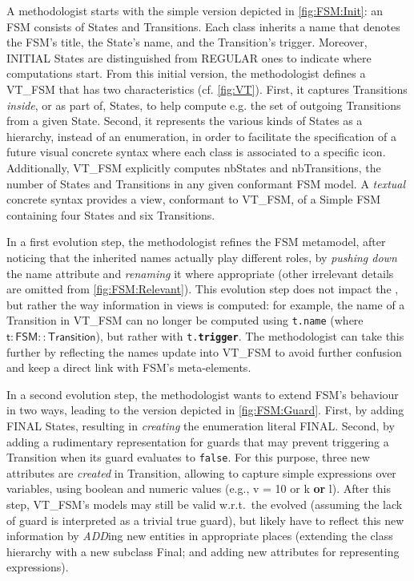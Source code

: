 A methodologist starts with the simple version depicted in \cref{fig:FSM:Init}:
an \textsf{FSM} consists of \textsf{State}s and \textsf{Transition}s. Each class
inherits a \textsf{name} that denotes the \textsf{FSM}'s title, the \textsf{State}'s
name, and the \textsf{Transition}'s trigger. Moreover, \textsf{INITIAL} \textsf{State}s
are distinguished from \textsf{REGULAR} ones to indicate where computations start.
From this initial version, the methodologist defines a \viewtype \textsf{VT\_FSM}
that has two characteristics (cf. \cref{fig:VT}). First, it captures \textsf{Transition}s \emph{inside},
or as part of, \textsf{State}s, to help compute e.g. the set of outgoing 
\textsf{Transition}s from a given \textsf{State}. Second, it represents the various
\textsf{kind}s of \textsf{State}s as a hierarchy, instead of an enumeration,
in order to facilitate the specification of a future visual concrete syntax where
each class is associated to a specific icon.
Additionally, \textsf{VT\_FSM} explicitly computes \textsf{nbStates} and 
\textsf{nbTransitions}, the number of \textsf{State}s and \textsf{Transition}s 
in any given conformant \textsf{FSM} model. A \emph{textual} concrete syntax 
provides a view, conformant to \textsf{VT\_FSM}, of a \textsf{Simple FSM} containing
four \textsf{State}s and six \textsf{Transition}s.


In a first evolution step, the methodologist refines the \textsf{FSM} metamodel,
after noticing that the inherited \textsf{name}s actually play different roles,
by  \emph{pushing down} the \textsf{name} attribute and \emph{renaming} it where
appropriate (other irrelevant details are omitted from \cref{fig:FSM:Relevant}). 
This evolution step does not impact the \viewtypes, but rather the way information
in views is computed: for example, the \textsf{name} of a \textsf{Transition} in
\textsf{VT\_FSM} can no longer be computed using \texttt{t.name} (where 
$\mathsf{t : FSM::Transition}$), but rather with \texttt{t.\textbf{trigger}}. 
The methodologist can take this further by reflecting the \textsf{name}s update
into \textsf{VT\_FSM} to avoid further confusion and keep a direct link with
\textsf{FSM}'s meta-elements.

In a second evolution step, the methodologist wants to extend \textsf{FSM}'s 
behaviour in two ways, leading to the version depicted in \cref{fig:FSM:Guard}. First, by adding \textsf{FINAL} \textsf{State}s,
resulting in \emph{creating} the enumeration literal \textsf{FINAL}.
Second, by adding a rudimentary representation for guards that may prevent 
triggering a \textsf{Transition} when its guard evaluates to \texttt{false}. 
For this purpose, three new attributes are \emph{created} in \textsf{Transition}, allowing to capture
simple expressions over \textsf{var}iables, using boolean and numeric \textsf{value}s
(e.g., \textsf{v = 10} or \textsf{k \textbf{or} l}). After this step, \textsf{VT\_FSM}'s
models may still be valid w.r.t.~the evolved \metamodel (assuming the lack of 
guard is interpreted as a trivial \textsf{true} guard),
but \viewtypes likely have to reflect this new information by \emph{ADD}ing new 
entities in appropriate places (extending the class hierarchy
with a new subclass \textsf{Final}; and adding new attributes for representing 
expressions).

